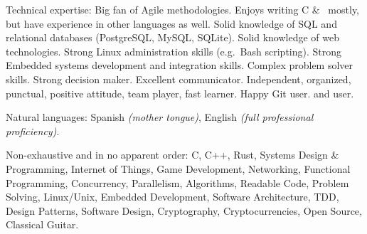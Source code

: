 \documentclass[10pt,a4paper]{article}
\begin{document}

\inlineheadsection  %
{Technical expertise:}
{Big fan of Agile methodologies. Enjoys writing C \& \nsp\CPP\nsp\, mostly, but have experience in other languages as well. Solid knowledge of SQL and relational databases (PostgreSQL, MySQL, SQLite). Solid knowledge of web technologies. Strong Linux administration skills (e.g.\ Bash scripting). Strong Embedded systems development and integration skills. Complex problem solver skills. Strong decision maker. Excellent communicator. Independent, organized, punctual, positive attitude, team player, fast learner. Happy Git user.  and  user.}

\vspace{0.5em}
\inlineheadsection
{Natural languages:}
{Spanish \emph{(mother tongue)}, English \emph{(full professional proficiency)}.}

\spacedhrule{1.6em}{-0.4em}


\inlineheadsection
{Non-exhaustive and in no apparent order:}
{C, C++, Rust, Systems Design \& Programming, Internet of Things, Game Development, Networking, Functional Programming, Concurrency, Parallelism, Algorithms, Readable Code, Problem Solving, Linux/Unix, Embedded Development, Software Architecture, TDD, Design Patterns, Software Design, Cryptography, Cryptocurrencies, Open Source, Classical Guitar.}
\end{document}
